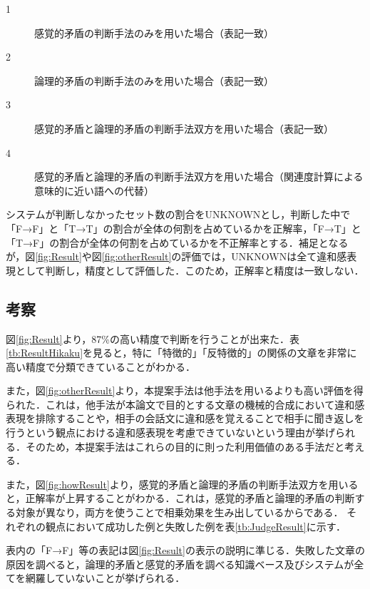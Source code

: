 \documentclass[japanese]{jnlp_1.4}
\begin{document}
\begin{description}
	\item[1] 感覚的矛盾の判断手法のみを用いた場合（表記一致）
	\item[2] 論理的矛盾の判断手法のみを用いた場合（表記一致）
	\item[3] 感覚的矛盾と論理的矛盾の判断手法双方を用いた場合（表記一致）
	\item[4] 感覚的矛盾と論理的矛盾の判断手法双方を用いた場合（関連度計算による意味的に近い語への代替）
\end{description}

システムが判断しなかったセット数の割合をUNKNOWNとし，判断した中で「F→F」と「T→T」の割合が全体の何割を占めているかを正解率，「F→T」と「T→F」の割合が全体の何割を占めているかを不正解率とする．補足となるが，図\ref{fig:Result}や図\ref{fig:otherResult}の評価では，UNKNOWNは全て違和感表現として判断し，精度として評価した．このため，正解率と精度は一致しない．

\subsection{考察}

図\ref{fig:Result}より，87\%の高い精度で判断を行うことが出来た．表\ref{tb:ResultHikaku}を見ると，特に「特徴的」「反特徴的」の関係の文章を非常に高い精度で分類できていることがわかる． 

また，図\ref{fig:otherResult}より，本提案手法は他手法を用いるよりも高い評価を得られた．これは，他手法が本論文で目的とする文章の機械的合成において違和感表現を排除することや，相手の会話文に違和感を覚えることで相手に聞き返しを行うという観点における違和感表現を考慮できていないという理由が挙げられる．そのため，本提案手法はこれらの目的に則った利用価値のある手法だと考える．

また，図\ref{fig:howResult}より，感覚的矛盾と論理的矛盾の判断手法双方を用いると，正解率が上昇することがわかる．これは，感覚的矛盾と論理的矛盾の判断する対象が異なり，両方を使うことで相乗効果を生み出しているからである． 
それぞれの観点において成功した例と失敗した例を表\ref{tb:JudgeResult}に示す．


表内の「F→F」等の表記は図\ref{fig:Result}の表示の説明に準じる．失敗した文章の原因を調べると，論理的矛盾と感覚的矛盾を調べる知識ベース及びシステムが全てを網羅していないことが挙げられる．
\end{document}
